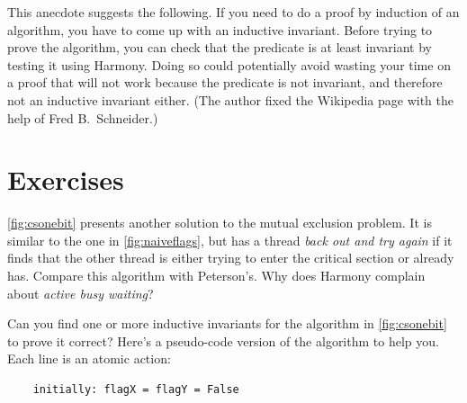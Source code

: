 \documentclass{report}
\newenvironment{code}{
\tcolorbox
}{
\endtcolorbox
}
\begin{document}
This anecdote suggests the following.  If you need to do a proof by induction
of an algorithm, you have to come up with an inductive invariant.
Before trying to prove the algorithm, you can check that the predicate is
at least invariant by testing it using Harmony.  Doing so could potentially
avoid wasting your time on a proof that will not work because the
predicate is not invariant, and therefore not an inductive invariant either.
(The author fixed the Wikipedia page with the help of Fred B.~Schneider.)

\section*{Exercises}
\begin{problems}
\item \autoref{fig:csonebit} presents another solution to the
mutual exclusion problem.  It is similar to the one in
\autoref{fig:naiveflags}, but has a thread \emph{back out and try again}
if it finds that the other thread is either trying to enter the critical
section or already has.  Compare this algorithm with Peterson's.
Why does Harmony complain about \emph{active busy waiting}?
\item
Can you find one or more inductive invariants for the algorithm in
\autoref{fig:csonebit} to prove it correct?
Here's a pseudo-code version of the algorithm to help you.  Each line
is an atomic action:
\begin{code}
\begin{verbatim}
    initially: flagX = flagY = False


\end{verbatim}
\end{code}
\end{problems}
\end{document}
